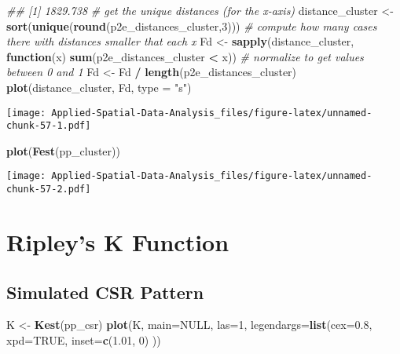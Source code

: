 \documentclass[
]{book}
\newenvironment{Shaded}{\begin{snugshade}}{\end{snugshade}}
\newcommand{\CommentTok}[1]{\textcolor[rgb]{0.56,0.35,0.01}{\textit{#1}}}
\newcommand{\ControlFlowTok}[1]{\textcolor[rgb]{0.13,0.29,0.53}{\textbf{#1}}}
\newcommand{\DataTypeTok}[1]{\textcolor[rgb]{0.13,0.29,0.53}{#1}}
\newcommand{\DecValTok}[1]{\textcolor[rgb]{0.00,0.00,0.81}{#1}}
\newcommand{\FloatTok}[1]{\textcolor[rgb]{0.00,0.00,0.81}{#1}}
\newcommand{\KeywordTok}[1]{\textcolor[rgb]{0.13,0.29,0.53}{\textbf{#1}}}
\newcommand{\NormalTok}[1]{#1}
\newcommand{\OperatorTok}[1]{\textcolor[rgb]{0.81,0.36,0.00}{\textbf{#1}}}
\newcommand{\OtherTok}[1]{\textcolor[rgb]{0.56,0.35,0.01}{#1}}
\newcommand{\StringTok}[1]{\textcolor[rgb]{0.31,0.60,0.02}{#1}}
\begin{document}
\begin{Shaded}
\begin{Highlighting}[]
\CommentTok{## [1] 1829.738}
\CommentTok{# get the unique distances (for the x-axis)}
\NormalTok{distance_cluster <-}\StringTok{ }\KeywordTok{sort}\NormalTok{(}\KeywordTok{unique}\NormalTok{(}\KeywordTok{round}\NormalTok{(p2e_distances_cluster,}\DecValTok{3}\NormalTok{)))}
\CommentTok{# compute how many cases there with distances smaller that each x}
\NormalTok{Fd <-}\StringTok{ }\KeywordTok{sapply}\NormalTok{(distance_cluster, }\ControlFlowTok{function}\NormalTok{(x) }\KeywordTok{sum}\NormalTok{(p2e_distances_cluster }\OperatorTok{<}\StringTok{ }\NormalTok{x))}
\CommentTok{# normalize to get values between 0 and 1}
\NormalTok{Fd <-}\StringTok{ }\NormalTok{Fd }\OperatorTok{/}\StringTok{ }\KeywordTok{length}\NormalTok{(p2e_distances_cluster)}
\KeywordTok{plot}\NormalTok{(distance_cluster, Fd, }\DataTypeTok{type =} \StringTok{"s"}\NormalTok{)}
\end{Highlighting}
\end{Shaded}

\texttt{[image: Applied-Spatial-Data-Analysis\_files/figure-latex/unnamed-chunk-57-1.pdf]}

\begin{Shaded}
\begin{Highlighting}[]
\KeywordTok{plot}\NormalTok{(}\KeywordTok{Fest}\NormalTok{(pp_cluster))}
\end{Highlighting}
\end{Shaded}

\texttt{[image: Applied-Spatial-Data-Analysis\_files/figure-latex/unnamed-chunk-57-2.pdf]}

\hypertarget{ripleys-k-function}{%
\section{Ripley's K Function}\label{ripleys-k-function}}

\hypertarget{simulated-csr-pattern-4}{%
\subsection{Simulated CSR Pattern}\label{simulated-csr-pattern-4}}

\begin{Shaded}
\begin{Highlighting}[]
\NormalTok{K <-}\StringTok{ }\KeywordTok{Kest}\NormalTok{(pp_csr)}
\KeywordTok{plot}\NormalTok{(K, }\DataTypeTok{main=}\OtherTok{NULL}\NormalTok{, }\DataTypeTok{las=}\DecValTok{1}\NormalTok{, }\DataTypeTok{legendargs=}\KeywordTok{list}\NormalTok{(}\DataTypeTok{cex=}\FloatTok{0.8}\NormalTok{, }\DataTypeTok{xpd=}\OtherTok{TRUE}\NormalTok{, }\DataTypeTok{inset=}\KeywordTok{c}\NormalTok{(}\FloatTok{1.01}\NormalTok{, }\DecValTok{0}\NormalTok{) ))}
\end{Highlighting}
\end{Shaded}
\end{document}
